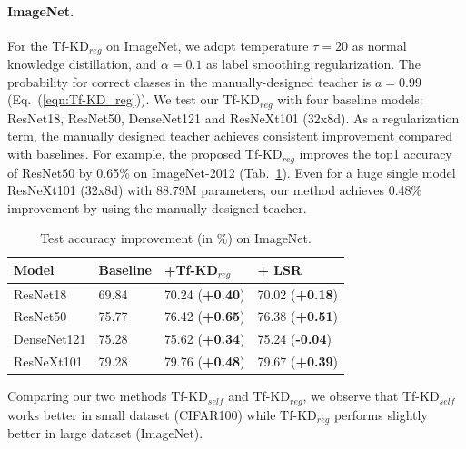 \documentclass[10pt,twocolumn,letterpaper]{article}
\begin{document}
\paragraph{ImageNet.} For the Tf-KD$_{reg}$ on ImageNet, we adopt temperature $\tau=20$ as normal knowledge distillation, and $\alpha=0.1$ as label smoothing regularization. The probability for correct classes in the manually-designed teacher is $a=0.99$ (Eq.~(\ref{eqn:Tf-KD_reg})). We test our Tf-KD$_{reg}$ with four baseline models: ResNet18, ResNet50, DenseNet121 and ResNeXt101 (32x8d). As a regularization term, the manually designed teacher achieves consistent improvement compared with baselines. For example, the proposed Tf-KD$_{reg}$ improves the top1 accuracy of ResNet50 by 0.65\% on ImageNet-2012 (Tab.~\ref{tab:KD_man_imagenet}). Even for a huge single model ResNeXt101 (32x8d) with 88.79M parameters, our method achieves 0.48\% improvement by using the manually designed teacher. 
\vspace{-10pt}

\begin{table}[h]
\centering
\caption{Test accuracy improvement (in $\%$) on ImageNet.}
\begin{tabular}{llll}
\hline
Model  & Baseline & +Tf-KD$_{reg}$  & + LSR\\ \hline
ResNet18   &69.84 &70.24 (\textbf{+0.40}) &70.02 (\textbf{+0.18})\\
ResNet50   &75.77 &76.42 (\textbf{+0.65}) &76.38 (\textbf{+0.51}) \\
DenseNet121 &75.28 &75.62 (\textbf{+0.34}) &75.24 (\textbf{-0.04}) \\ 
ResNeXt101 &79.28 &79.76 (\textbf{+0.48}) &79.67 (\textbf{+0.39})\\\hline
\end{tabular}
\label{tab:KD_man_imagenet}
\vspace{-10pt}
\end{table}

Comparing our two methods Tf-KD$_{self}$ and Tf-KD$_{reg}$, we observe that Tf-KD$_{self}$ works better in small dataset (CIFAR100) while Tf-KD$_{reg}$ performs slightly better in large dataset (ImageNet).

\vspace{-15pt}
\end{document}
